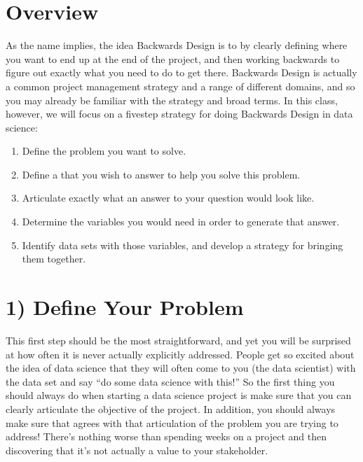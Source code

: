 \documentclass[letterpaper,10pt,english]{jupyterBook}
\begin{document}
\section{Overview}
\label{\detokenize{40_in_practice/00_backwards_design:overview}}
\sphinxAtStartPar
As the name implies, the idea Backwards Design is to  by clearly defining where you want to end up at the end of the project, and then working backwards to figure out exactly what you need to do to get there. Backwards Design is actually a common project management strategy and a range of different domains, and so you may already be familiar with the strategy and broad terms. In this class, however, we will focus on a five\sphinxhyphen{}step strategy for doing Backwards Design in data science:
\begin{enumerate}
%
\item {} 
\sphinxAtStartPar
Define the problem you want to solve.

\item {} 
\sphinxAtStartPar
Define a  that you wish to answer to help you solve this problem.

\item {} 
\sphinxAtStartPar
Articulate exactly what an answer to your question would look like.

\item {} 
\sphinxAtStartPar
Determine the variables you would need in order to generate that answer.

\item {} 
\sphinxAtStartPar
Identify data sets with those variables, and develop a strategy for bringing them together.

\end{enumerate}


\section{1) Define Your Problem}
\label{\detokenize{40_in_practice/00_backwards_design:define-your-problem}}
\sphinxAtStartPar
This first step should be the most straightforward, and yet you will be surprised at how often it is never actually explicitly addressed. People get so excited about the idea of data science that they will often come to you (the data scientist) with the data set and say “do some data science with this!” So the first thing you should always do when starting a data science project is make sure that you can clearly articulate the objective of the project. In addition, you should always make sure that  agrees with that articulation of the problem you are trying to address! There’s nothing worse than spending weeks on a project and then discovering that it’s not actually a value to your stakeholder.
\end{document}
